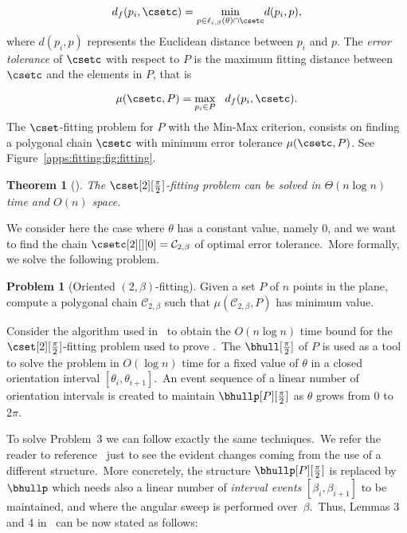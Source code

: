 \documentclass[11pt,letterpaper,english]{article}
\newtheorem{theorem}{Theorem}
\theoremstyle{definition}
\newtheorem{problem}{Problem}
\begin{document}
$$
d_f(p_i,\csetc) = \underset{p \in \ell_{i,\beta}(\theta) \cap
  \csetc}{\text{min}} d(p_i,p),
$$
where $d(p_i,p)$ represents the Euclidean distance between $p_i$ and
$p$. The \emph{error tolerance} of $\csetc$ with respect to $P$ is the
maximum fitting distance between $\csetc$ and the elements in $P$,
that is

$$
\mu(\csetc,P) = \underset{p_i \in P} \max \hspace{0.3cm} d_f(p_i,\csetc).
$$
The $\cset$-fitting problem for $P$ with the Min-Max criterion,
consists on finding a polygonal chain $\csetc$ with minimum error
tolerance $\mu(\csetc,P)$. See Figure~\ref{apps:fitting:fig:fitting}.

\begin{theorem}[\cite{fitting_2011}]
  \label{apps:fitting:thm:2-fitting}
  The $\cset[2][\frac{\pi}{2}]$-fitting problem can be solved in
  $\Theta(n \log n)$ time and $O(n)$ space.
\end{theorem}

We consider here the case where $\theta$ has a constant value, namely
$0$, and we want to find the chain
$\csetc[2][][0] = \mathcal{C}_{2,\beta}$ of optimal error
tolerance.~More formally, we solve the following problem.

\begin{problem}[Oriented $\left( 2,\beta \right)$-fitting]
  Given a set $P$ of $n$ points in the plane, compute a polygonal
  chain $\mathcal{C}_{2,\beta}$ such that
  $\mu(\mathcal{C}_{2,\beta},P)$ has minimum value.
\end{problem}

Consider the algorithm used in~\cite{fitting_2011} to obtain the
$O(n \log n)$ time bound for the $\cset[2][\frac{\pi}{2}]$-fitting
problem used to prove .~The
$\bhull[\frac{\pi}{2}]$ of $P$ is used as a tool to solve the problem
in $O(\log n)$ time for a fixed value of $\theta$ in a closed
orientation interval $[\theta_i,\theta_{i+1}]$.~An event sequence of a
linear number of orientation intervals is created to maintain
$\bhullp[P][\frac{\pi}{2}]$ as $\theta$ grows from $0$ to $2\pi$.

To solve Problem~3 we can follow exactly the same techniques.~We refer
the reader to reference~\cite{fitting_2011} just to see the evident
changes coming from the use of a different structure.~More concretely,
the structure $\bhullp[P][\frac{\pi}{2}]$ is replaced by $\bhullp$
which needs also a linear number of \emph{interval events}
$[\beta_i,\beta_{i+1}]$ to be maintained, and where the angular sweep
is performed over~$\beta$.~Thus, Lemmas 3 and 4
in~\cite{fitting_2011} can be now stated as follows:\\
\end{document}
